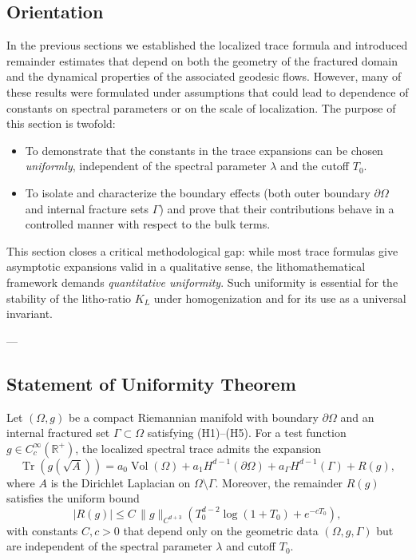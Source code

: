 \subsection*{Orientation}
In the previous sections we established the localized trace formula 
and introduced remainder estimates that depend on both the geometry of the fractured domain 
and the dynamical properties of the associated geodesic flows.
However, many of these results were formulated under assumptions that could lead to 
dependence of constants on spectral parameters or on the scale of localization.  
The purpose of this section is twofold:

\begin{itemize}
  \item To demonstrate that the constants in the trace expansions 
  can be chosen \emph{uniformly}, independent of the spectral parameter $\lambda$ 
  and the cutoff $T_0$.
  \item To isolate and characterize the boundary effects 
  (both outer boundary $\partial\Omega$ and internal fracture sets $\Gamma$) 
  and prove that their contributions behave in a controlled manner 
  with respect to the bulk terms.
\end{itemize}

This section closes a critical methodological gap: while most trace formulas 
give asymptotic expansions valid in a qualitative sense, 
the lithomathematical framework demands \emph{quantitative uniformity}.
Such uniformity is essential for the stability of the litho-ratio $K_L$ 
under homogenization and for its use as a universal invariant.

---

\subsection{Statement of Uniformity Theorem}

\begin{theorem}
\label{thm:uniform-remainder}
Let $(\Omega,g)$ be a compact Riemannian manifold with boundary $\partial\Omega$ 
and an internal fractured set $\Gamma \subset \Omega$ satisfying (H1)--(H5). 
For a test function $g \in C_c^\infty(\mathbb{R}^+)$, 
the localized spectral trace admits the expansion
\[
\operatorname{Tr}(g(\sqrt{A})) 
= a_0 \operatorname{Vol}(\Omega) + a_1 H^{d-1}(\partial\Omega) 
+ a_\Gamma H^{d-1}(\Gamma) + R(g),
\]
where $A$ is the Dirichlet Laplacian on $\Omega \setminus \Gamma$.
Moreover, the remainder $R(g)$ satisfies the uniform bound
\[
|R(g)| \leq C \, \|g\|_{C^{d+3}} 
\left( T_0^{d-2} \log(1+T_0) + e^{-cT_0} \right),
\]
with constants $C,c > 0$ that depend only on the geometric data $(\Omega,g,\Gamma)$ 
but are independent of the spectral parameter $\lambda$ and cutoff $T_0$.
\end{theorem}

